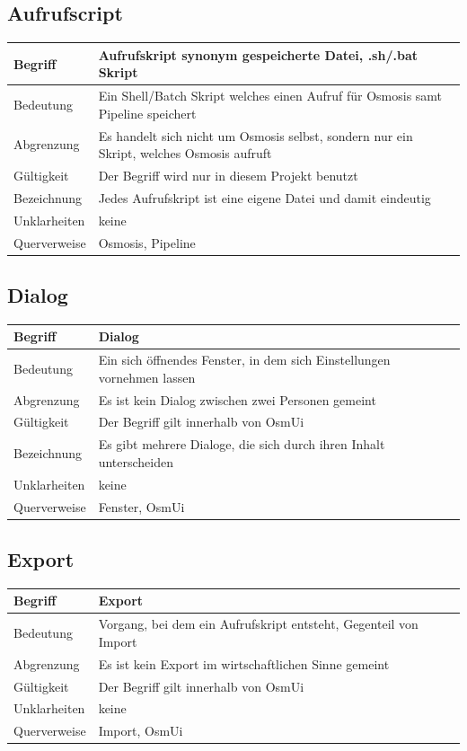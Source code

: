 \documentclass[a4paper,12pt]{scrartcl}
\begin{document}
\subsection{Aufrufscript}
\begin{center}
\begin{tabular}{|p{5cm}|p{10cm}|}
\hline Begriff & \textbf{Aufrufskript} synonym gespeicherte Datei, .sh/.bat Skript\\ 
\hline Bedeutung & Ein Shell/Batch Skript welches einen Aufruf für Osmosis samt Pipeline speichert \\
\hline Abgrenzung & Es handelt sich nicht um Osmosis selbst, sondern nur ein Skript, welches Osmosis aufruft \\ 
\hline Gültigkeit &  Der Begriff wird nur in diesem Projekt benutzt \\ 
\hline Bezeichnung &  Jedes Aufrufskript ist eine eigene Datei und damit eindeutig\\ 
\hline Unklarheiten &  keine \\ 
\hline Querverweise &  Osmosis, Pipeline\\ 
\hline 
\end{tabular}
\subsection{Dialog}
\begin{tabular}{|p{5cm}|p{10cm}|}
\hline Begriff & \textbf{Dialog}\\ 
\hline Bedeutung & Ein sich öffnendes Fenster, in dem sich Einstellungen vornehmen lassen \\ 
\hline Abgrenzung & Es ist kein Dialog zwischen zwei Personen gemeint\\ 
\hline Gültigkeit & Der Begriff gilt innerhalb von OsmUi \\ 
\hline Bezeichnung & Es gibt mehrere Dialoge, die sich durch ihren Inhalt unterscheiden \\ 
\hline Unklarheiten & keine \\ 
\hline Querverweise & Fenster, OsmUi \\ 
\hline
\end{tabular}
\subsection{Export}
\begin{tabular}{|p{5cm}|p{10cm}|}
\hline Begriff & \textbf{Export}\\
\hline Bedeutung & Vorgang, bei dem ein Aufrufskript entsteht, Gegenteil von Import \\ 
\hline Abgrenzung & Es ist kein Export im wirtschaftlichen  Sinne gemeint\\ 
\hline Gültigkeit & Der Begriff gilt innerhalb von OsmUi \\ 
\hline Unklarheiten & keine \\ 
\hline Querverweise & Import, OsmUi \\ 
\hline
\end{tabular}

\end{center}
\end{document}
